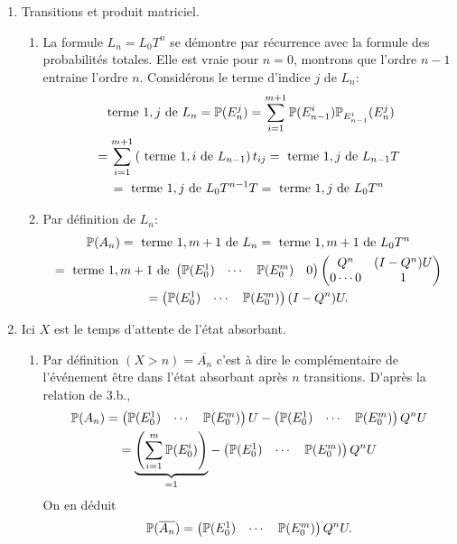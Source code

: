 \begin{enumerate}
  \item Transitions et produit matriciel.
  \begin{enumerate}
    \item La formule $L_n = L_0 T^n$ se démontre par récurrence avec la formule des probabilités totales. Elle est vraie pour $n=0$, montrons que l'ordre $n-1$ entraine l'ordre $n$. Considérons le terme d'indice $j$ de $L_n$:
\begin{multline*}
\text{ terme $1, j$ de } L_{n} = \mathbb{P}(E_n^j) = \sum_{i=1}^{m+1} \mathbb{P}(E_{n-1}^i) \mathbb{P}_{E_{n-1}^i}(E_n^j) \\
  = \sum_{i=1}^{m+1} \left(\text{ terme $1, i$ de } L_{n-1}\right) t_{i j} 
  = \text{ terme $1, j$ de } L_{n-1} T\\
  = \text{ terme $1, j$ de } L_{0} T^{n-1} T
  = \text{ terme $1, j$ de } L_{0} T^{n}
\end{multline*}

    \item Par définition de $L_n$:
\begin{multline*}
  \mathbb{P}(A_n)
  = \text{ terme $1, m+1$ de } L_{n}
  = \text{ terme $1, m+1$ de } L_{0}T^n\\
  = \text{ terme $1, m+1$ de }
\begin{pmatrix}
  \mathbb{P}(E_0^1) & \cdots & \mathbb{P}(E_0^m) & 0
\end{pmatrix}
  \begin{pmatrix}
    Q^{n} & (I - Q^{n})U \\ 0 \cdots 0 & 1
  \end{pmatrix} \\
=
\begin{pmatrix}
  \mathbb{P}(E_0^1) & \cdots & \mathbb{P}(E_0^m)
\end{pmatrix}
(I -Q^n)U .
\end{multline*}

  \end{enumerate}

  \item Ici $X$ est le temps d'attente de l'état absorbant.
  \begin{enumerate}
    \item Par définition $(X> n) = \overline{A_n}$ c'est à dire le complémentaire de l'événement \og être dans l'état absorbant après $n$ transitions\fg. D'après la relation de 3.b.,
\begin{multline*}
  \mathbb{P}(A_n) = 
\begin{pmatrix}
  \mathbb{P}(E_0^1) & \cdots & \mathbb{P}(E_0^m) 
\end{pmatrix}
U
-
\begin{pmatrix}
  \mathbb{P}(E_0^1) & \cdots & \mathbb{P}(E_0^m) 
\end{pmatrix}
Q^n U \\
= \underset{ = 1}{\underbrace{\left(\sum_{i=1}^{m} \mathbb{P}(E_0^i)\right)}} -
\begin{pmatrix}
  \mathbb{P}(E_0^1) & \cdots & \mathbb{P}(E_0^m) 
\end{pmatrix}
Q^n U 
\end{multline*}
On en déduit
\[
  \mathbb{P}(\overline{A_n}) = 
\begin{pmatrix}
  \mathbb{P}(E_0^1) & \cdots & \mathbb{P}(E_0^m) 
\end{pmatrix}
Q^n U .
\]


\end{enumerate}
\end{enumerate}
